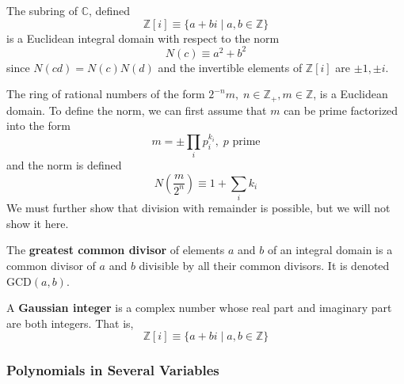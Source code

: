 \documentclass{article}
\begin{document}
      \begin{example}
        The subring of $\mathbb{C}$, defined
        \begin{equation}
          \mathbb{Z}[i] \equiv \{ a + b i \; | \; a, b \in \mathbb{Z} \}
        \end{equation}
        is a Euclidean integral domain with respect to the norm 
        \begin{equation}
          N(c) \equiv a^2 + b^2
        \end{equation}
        since $N(c d) = N(c) N(d)$ and the invertible elements of $\mathbb{Z}[i]$ are $\pm 1, \pm i$. 
      \end{example}

      \begin{example}
        The ring of rational numbers of the form $2^{-n} m, \; n \in \mathbb{Z}_+, m \in \mathbb{Z}$, is a Euclidean domain. To define the norm, we can first assume that $m$ can be prime factorized into the form 
        \begin{equation}
          m = \pm \prod_{i} p_{i}^{k_i}, \; p \text{ prime}
        \end{equation}
        and the norm is defined 
        \begin{equation}
          N(\frac{m}{2^n}) \equiv 1 + \sum_i k_i
        \end{equation}
        We must further show that division with remainder is possible, but we will not show it here. 
      \end{example}

      \begin{definition}
        The \textbf{greatest common divisor} of elements $a$ and $b$ of an integral domain is a common divisor of $a$ and $b$ divisible by all their common divisors. It is denoted GCD$(a, b)$. 
      \end{definition}

      \begin{definition}
        A \textbf{Gaussian integer} is a complex number whose real part and imaginary part are both integers. That is, 
        \begin{equation}
          \mathbb{Z}[i] \equiv \{a + b i \;|\; a, b \in \mathbb{Z} \}
        \end{equation}
      \end{definition}

    \subsubsection{Polynomials in Several Variables}
\end{document}
